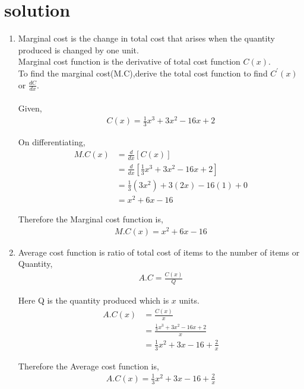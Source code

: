 \documentclass[article,12pt,twocolumn]{IEEEtran}
\begin{document}
  \section*{solution}
     \begin{enumerate}[ label=(\roman*)]
    \item Marginal cost is the change in total cost that arises when the quantity produced is changed by one unit. \\
          Marginal cost function is the derivative of total cost function $C(x)$.\\
          To find the marginal cost(M.C),derive the total cost function to find $C^{\prime}(x)$ or $\frac{dC}{dx}$. \\\\
          
      Given,
          \begin{align}
            C(x) = \frac{1}{3}x^3 + 3x^2 - 16x +2
          \end{align}
          
      On differentiating,
          \begin{align}
            M.C(x) &= \frac{d}{dx} [C(x)]
            \\
            &= \frac{d}{dx} [\frac{1}{3}x^3 + 3x^2 - 16x +2] 
            \\
            &= \frac{1}{3}(3x^2) + 3(2x)-16(1)+0 
            \\
            &= x^2+6x-16
          \end{align}  
          
      Therefore the Marginal cost function is,
          \begin{align*}
            M.C(x)=x^2+6x-16
          \end{align*}        
      
    \item Average cost function is ratio of total cost of items to the number of items or Quantity,
         \begin{align}
           A.C=\frac{C(x)}{Q}
         \end{align}
         
    Here Q is the quantity produced which is $x$ units.
        \begin{align}
          A.C(x) &=\frac{C(x)}{x} 
          \\
          &=\frac{\frac{1}{3}x^3 + 3x^2 - 16x +2}{x} 
          \\
          &=\frac{1}{3}x^2 + 3x - 16 +\frac{2}{x}
        \end{align}    
               
    Therefore the Average cost function is,
         \begin{align*}
           A.C(x)=\frac{1}{3}x^2 + 3x - 16 +\frac{2}{x}
         \end{align*}
         
   \end{enumerate}
   
\end{document}
